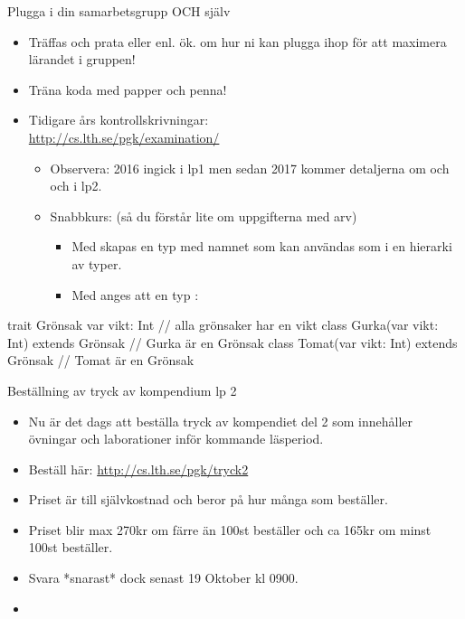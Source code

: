 \begin{Slide}{Plugga i din samarbetsgrupp OCH själv}
\begin{itemize}
\item Träffas och prata  eller enl. ök. om hur ni kan plugga ihop för att maximera lärandet i gruppen!

\pause
\item Träna koda med papper och penna!
\item Tidigare års kontrollskrivningar: \\ \url{http://cs.lth.se/pgk/examination/}

\begin{itemize}
    \item Observera: 2016 ingick  i lp1 men sedan 2017 kommer detaljerna om  och  och  i lp2.
\pause
\item Snabbkurs: (så du förstår lite om uppgifterna med arv)
\begin{itemize}\SlideFontSmall
\item Med  skapas en typ med namnet  som kan användas som  i en hierarki av typer.
\item Med  anges att en typ  :
\end{itemize}

\end{itemize}

\end{itemize}
\begin{Code}
  trait Grönsak { var vikt: Int }   // alla grönsaker har en vikt
  class Gurka(var vikt: Int) extends Grönsak  // Gurka är en Grönsak
  class Tomat(var vikt: Int) extends Grönsak  // Tomat är en Grönsak
\end{Code}
\end{Slide}


\begin{Slide}{Beställning av tryck av kompendium lp 2}\SlideFontSmall

\begin{itemize}
\item Nu är det dags att beställa tryck av kompendiet del 2 som innehåller
övningar och laborationer inför kommande läsperiod.

\item Beställ här: \url{http://cs.lth.se/pgk/tryck2}

\item Priset är till självkostnad och beror på hur många som beställer.
\item Priset blir max 270kr om färre än 100st beställer
och ca 165kr om minst 100st beställer.

\item Svara *snarast* dock senast 19 Oktober kl 0900.

\item {}

\end{itemize}
\end{Slide}


